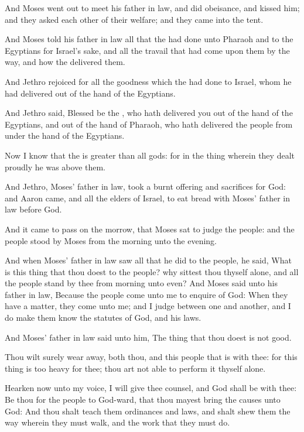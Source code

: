 \verse And Moses went out to meet his father in law, and did obeisance, and kissed him; and they asked each other of their welfare; and they came into the tent.

\verse And Moses told his father in law all that the \LORD had done unto Pharaoh and to the Egyptians for Israel's sake, and all the travail that had come upon them by the way, and how the \LORD delivered them.

\verse And Jethro rejoiced for all the goodness which the \LORD had done to Israel, whom he had delivered out of the hand of the Egyptians.

\verse And Jethro said, Blessed be the \LORD, who hath delivered you out of the hand of the Egyptians, and out of the hand of Pharaoh, who hath delivered the people from under the hand of the Egyptians.

\verse Now I know that the \LORD is greater than all gods: for in the thing wherein they dealt proudly he was above them.

\verse And Jethro, Moses' father in law, took a burnt offering and sacrifices for God: and Aaron came, and all the elders of Israel, to eat bread with Moses' father in law before God.

\verse And it came to pass on the morrow, that Moses sat to judge the people: and the people stood by Moses from the morning unto the evening.

\verse And when Moses' father in law saw all that he did to the people, he said, What is this thing that thou doest to the people? why sittest thou thyself alone, and all the people stand by thee from morning unto even?  \verse And Moses said unto his father in law, Because the people come unto me to enquire of God: \verse When they have a matter, they come unto me; and I judge between one and another, and I do make them know the statutes of God, and his laws.

\verse And Moses' father in law said unto him, The thing that thou doest is not good.

\verse Thou wilt surely wear away, both thou, and this people that is with thee: for this thing is too heavy for thee; thou art not able to perform it thyself alone.

\verse Hearken now unto my voice, I will give thee counsel, and God shall be with thee: Be thou for the people to God-ward, that thou mayest bring the causes unto God: \verse And thou shalt teach them ordinances and laws, and shalt shew them the way wherein they must walk, and the work that they must do.

